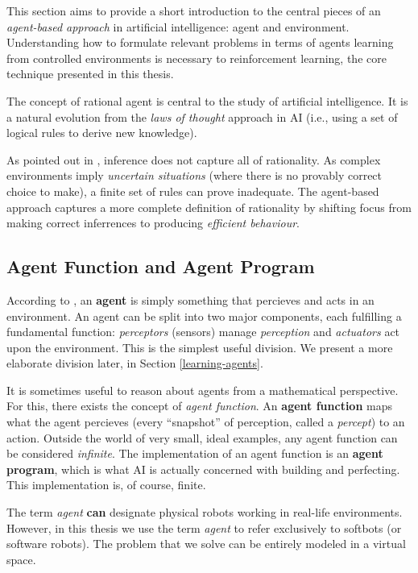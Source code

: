 This section aims to provide a short introduction to the central pieces of an \emph{agent-based approach} in artificial intelligence: agent and environment.
Understanding how to formulate relevant problems in terms of agents learning from controlled environments is necessary to reinforcement learning, the core technique presented in this thesis.

The concept of rational agent is central to the study of artificial intelligence. 
It is a natural evolution from the \emph{laws of thought} approach in AI (i.e., using a set of logical rules to derive new knowledge).

As pointed out in \cite{aima}, inference does not capture all of rationality.
As complex environments imply \textit{uncertain situations} (where there is no provably correct choice to make), a finite set of rules can prove inadequate.
The agent-based approach captures a more complete definition of rationality by shifting focus from making correct inferrences to producing \emph{efficient behaviour}.

\subsection{Agent Function and Agent Program}
According to \cite{aima}, an \textbf{agent} is simply something that percieves and acts in an environment.
An agent can be split into two major components, each fulfilling a fundamental function:
\emph{perceptors} (sensors) manage \emph{perception} and \emph{actuators} act upon the environment.
This is the simplest useful division. We present a more elaborate division later, in Section \ref{learning-agents}.

It is sometimes useful to reason about agents from a mathematical perspective.
For this, there exists the concept of \emph{agent function}.
An \textbf{agent function} maps what the agent percieves (every ``snapshot'' of perception, called a \emph{percept}) to an action.
Outside the world of very small, ideal examples, any agent function can be considered \emph{infinite}.
The implementation of an agent function is an \textbf{agent program}, which is what AI is actually concerned with building and perfecting.
This implementation is, of course, finite.

The term \emph{agent} \textbf{can} designate physical robots working in real-life environments.
However, in this thesis we use the term \textit{agent} to refer exclusively to softbots (or software robots).
The problem that we solve can be entirely modeled in a virtual space.

